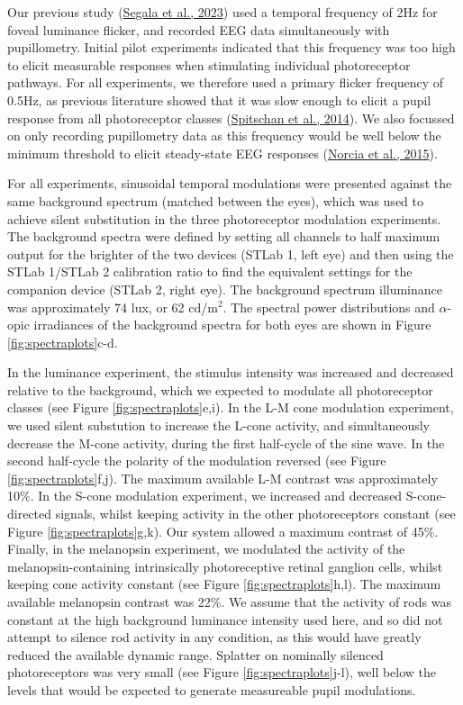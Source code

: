 \documentclass[
]{article}
\begin{document}
Our previous study (\protect\hyperlink{ref-Segala2023}{Segala et al., 2023}) used a temporal frequency of 2Hz for foveal luminance flicker, and recorded EEG data simultaneously with pupillometry. Initial pilot experiments indicated that this frequency was too high to elicit measurable responses when stimulating individual photoreceptor pathways. For all experiments, we therefore used a primary flicker frequency of 0.5Hz, as previous literature showed that it was slow enough to elicit a pupil response from all photoreceptor classes (\protect\hyperlink{ref-Spitschan2014}{Spitschan et al., 2014}). We also focussed on only recording pupillometry data as this frequency would be well below the minimum threshold to elicit steady-state EEG responses (\protect\hyperlink{ref-Norcia2015}{Norcia et al., 2015}).

For all experiments, sinusoidal temporal modulations were presented against the same background spectrum (matched between the eyes), which was used to achieve silent substitution in the three photoreceptor modulation experiments. The background spectra were defined by setting all channels to half maximum output for the brighter of the two devices (STLab 1, left eye) and then using the STLab 1/STLab 2 calibration ratio to find the equivalent settings for the companion device (STLab 2, right eye). The background spectrum illuminance was approximately 74 lux, or 62 cd/m\(^2\). The spectral power distributions and \(\alpha\)-opic irradiances of the background spectra for both eyes are shown in Figure \ref{fig:spectraplots}c-d.

In the luminance experiment, the stimulus intensity was increased and decreased relative to the background, which we expected to modulate all photoreceptor classes (see Figure \ref{fig:spectraplots}e,i). In the L-M cone modulation experiment, we used silent substution to increase the L-cone activity, and simultaneously decrease the M-cone activity, during the first half-cycle of the sine wave. In the second half-cycle the polarity of the modulation reversed (see Figure \ref{fig:spectraplots}f,j). The maximum available L-M contrast was approximately 10\%. In the S-cone modulation experiment, we increased and decreased S-cone-directed signals, whilst keeping activity in the other photoreceptors constant (see Figure \ref{fig:spectraplots}g,k). Our system allowed a maximum contrast of 45\%. Finally, in the melanopsin experiment, we modulated the activity of the melanopsin-containing intrinsically photoreceptive retinal ganglion cells, whilst keeping cone activity constant (see Figure \ref{fig:spectraplots}h,l). The maximum available melanopsin contrast was 22\%. We assume that the activity of rods was constant at the high background luminance intensity used here, and so did not attempt to silence rod activity in any condition, as this would have greatly reduced the available dynamic range. Splatter on nominally silenced photoreceptors was very small (see Figure \ref{fig:spectraplots}j-l), well below the levels that would be expected to generate measureable pupil modulations.
\end{document}
